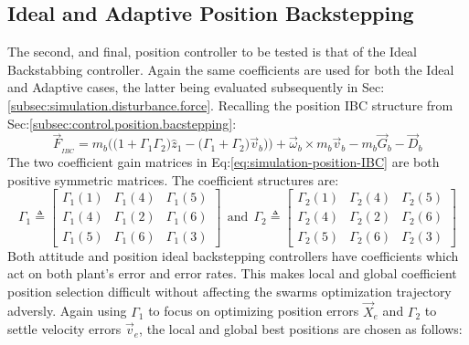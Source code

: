 \subsection{Ideal and Adaptive Position Backstepping}
\label{subsec:simulation.position.pd}
The second, and final, position controller to be tested is that of the Ideal Backstabbing controller. Again the same coefficients are used for both the Ideal and Adaptive cases, the latter being evaluated subsequently in Sec:\ref{subsec:simulation.disturbance.force}. Recalling the position IBC structure from Sec:\ref{subsec:control.position.bacstepping}:
\begin{equation}\label{eq:simulation-position-IBC}
\vec{F}_{_{IBC}}=m_b\Big(\big(1+\Gamma_1\Gamma_2\big)\hat{z}_1-\big(\Gamma_1+\Gamma_2\big)\vec{v}_b\big)\Big)+\vec{\omega}_b\times m_b\vec{v}_b-m_b\vec{G}_b-\vec{D}_b
\end{equation}
The two coefficient gain matrices in Eq:\ref{eq:simulation-position-IBC} are both positive symmetric matrices. The coefficient structures are:
\begin{equation}\label{eq:simulation-position-diagonal-coefficients}
\Gamma_1\triangleq \begin{bmatrix}
\Gamma_1(1) & \Gamma_1(4) & \Gamma_1(5)\\
\Gamma_1(4) & \Gamma_1(2) & \Gamma_1(6)\\
\Gamma_1(5) & \Gamma_1(6) & \Gamma_1(3)
\end{bmatrix}
~~\text{and}~~\Gamma_2\triangleq \begin{bmatrix}
\Gamma_2(1) & \Gamma_2(4) & \Gamma_2(5)\\
\Gamma_2(4) & \Gamma_2(2) & \Gamma_2(6)\\
\Gamma_2(5) & \Gamma_2(6) & \Gamma_2(3)
\end{bmatrix}
\end{equation}
Both attitude and position ideal backstepping controllers have coefficients which act on both plant's error and error rates. This makes local and global coefficient position selection difficult without affecting the swarms optimization trajectory adversly. Again using $\Gamma_1$ to focus on optimizing position errors $\vec{X}_e$ and $\Gamma_2$ to settle velocity errors $\vec{v}_e$, the local and global best positions are chosen as follows:

